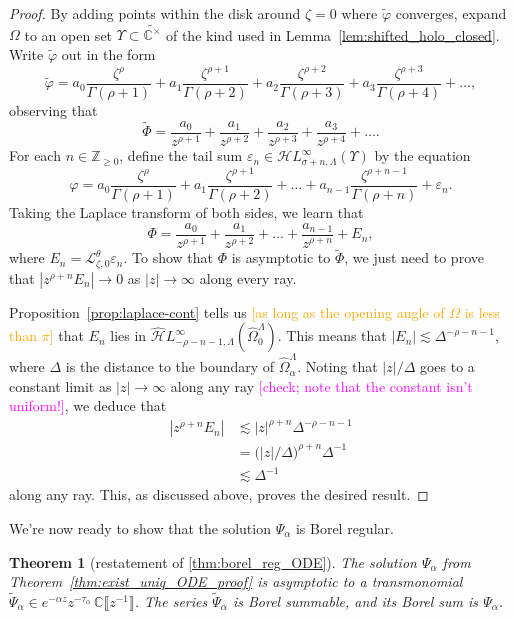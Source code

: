 \documentclass{article}
\newcommand{\singexp}[2]{\mathcal{H}L^\infty_{#1, #2}}
\newcommand{\dualsingexp}[2]{\widehat{\mathcal{H}}L^\infty_{#1, #2}}
\newcommand{\Z}{\mathbb{Z}}
\newcommand{\C}{\mathbb{C}}
\newcommand{\series}[1]{\tilde{#1}}
\newcommand{\laplace}{\mathcal{L}}
\theoremstyle{definition}
\theoremstyle{plain}
\newtheorem{theorem}{Theorem}[section]
\begin{document}
\begin{proof}
By adding points within the disk around $\zeta = 0$ where $\series{\varphi}$ converges, expand $\Omega$ to an open set $\Upsilon \subset \widetilde{\C^\times}$ of the kind used in Lemma~\ref{lem:shifted_holo_closed}. Write $\series{\varphi}$ out in the form
\[ \series{\varphi} = a_0 \frac{\zeta^\rho}{\Gamma(\rho+1)} + a_1 \frac{\zeta^{\rho+1}}{\Gamma(\rho+2)} + a_2 \frac{\zeta^{\rho+2}}{\Gamma(\rho+3)} + a_3 \frac{\zeta^{\rho+3}}{\Gamma(\rho+4)} + \ldots, \]
observing that
\[ \series{\Phi} = \frac{a_0}{z^{\rho+1}} + \frac{a_1}{z^{\rho+2}} + \frac{a_2}{z^{\rho+3}} + \frac{a_3}{z^{\rho+4}} + \ldots. \]
For each $n \in \Z_{\ge 0}$, define the tail sum $\varepsilon_n \in \singexp{\sigma+n}{\Lambda}(\Upsilon)$ by the equation
\[ \varphi = a_0 \frac{\zeta^\rho}{\Gamma(\rho+1)} + a_1 \frac{\zeta^{\rho+1}}{\Gamma(\rho+2)} + \ldots + a_{n-1} \frac{\zeta^{\rho+n-1}}{\Gamma(\rho+n)} + \varepsilon_n. \]
Taking the Laplace transform of both sides, we learn that
\[ \Phi = \frac{a_0}{z^{\rho+1}} + \frac{a_1}{z^{\rho+2}} + \ldots + \frac{a_{n-1}}{z^{\rho+n}} + E_n, \]
where $E_n = \laplace_{\zeta, 0}^\theta \varepsilon_n$. To show that $\Phi$ is asymptotic to $\series{\Phi}$, we just need to prove that $|z^{\rho+n} E_n| \to 0$ as $|z| \to \infty$ along every ray.

Proposition~\ref{prop:laplace-cont} tells us \textcolor{orange}{[as long as the opening angle of $\Omega$ is less than $\pi$]} that $E_n$ lies in $\dualsingexp{-\rho-n-1}{\Lambda}(\widehat{\Omega}_0^\Lambda)$. This means that $|E_n| \lesssim \Delta^{-\rho-n-1}$, where $\Delta$ is the distance to the boundary of $\widehat{\Omega}_\alpha^\Lambda$. Noting that $|z|/\Delta$ goes to a constant limit as $|z| \to \infty$ along any ray \textcolor{magenta}{[check; note that the constant isn't uniform!]}, we deduce that
\begin{align*}
|z^{\rho+n} E_n| & \lesssim |z|^{\rho+n} \Delta^{-\rho-n-1} \\
& = \big(|z|/\Delta\big)^{\rho+n} \Delta^{-1} \\
& \lesssim \Delta^{-1}
\end{align*}
along any ray. This, as discussed above, proves the desired result.

\end{proof}
We're now ready to show that the solution $\Psi_\alpha$ is Borel regular.
\begin{theorem}[restatement of \ref{thm:borel_reg_ODE}]\label{thm:borel_reg_ODE_proof}
The solution $\Psi_\alpha$ from Theorem~\ref{thm:exist_uniq_ODE_proof} is asymptotic to a transmonomial $\series{\Psi}_\alpha \in e^{-\alpha z} z^{-\tau_\alpha}\,\C \llbracket z^{-1} \rrbracket$. The series $\series{\Psi}_\alpha$ is Borel summable, and its Borel sum is $\Psi_\alpha$.
\end{theorem}
\end{document}
